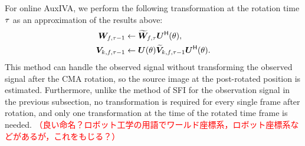 \documentclass[sip,biber]{now-journal}
\newcommand{\todo}[1]{\textcolor{red}{#1}}
\begin{document}
For online AuxIVA, we perform the following transformation at the rotation time $\tau$ as an approximation of the results above:
\begin{align}
  \bm{W} _{f,\tau - 1} &\gets \widetilde{\bm{W}} _{f,\tau} \bm{U} ^{\mathsf{H}} (\theta), \\
  \bm{V} _{k,f,\tau - 1} &\gets \bm{U} (\theta) \widetilde{\bm{V}} _{k,f,\tau - 1} \bm{U} ^{\mathsf{H}} (\theta).
\end{align}
This method can handle the observed signal without transforming the observed signal after the CMA rotation, so the source image at the post-rotated position is estimated.
Furthermore, unlike the method of SFI for the observation signal in the previous subsection, no transformation is required for every single frame after rotation, and only one transformation at the time of the rotated time frame is needed.
\todo{%
  （良い命名？ロボット工学の用語でワールド座標系，ロボット座標系などがあるが，これをもじる？）
}
\end{document}
